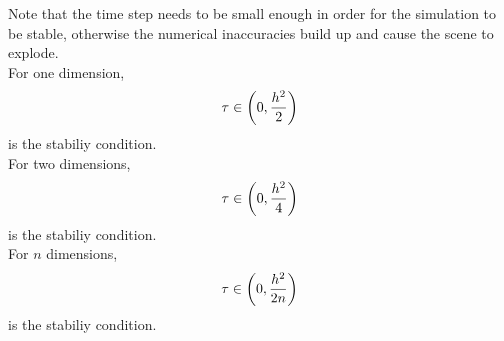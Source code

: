 \documentclass[12pt]{article}
\begin{document}
Note that the time step needs to be small enough
in order for the simulation to be stable, otherwise
the numerical inaccuracies build up and cause
the scene to explode. \\
For one dimension, \[ \tau \in \left( 0, 
\dfrac{h^2}{2} \right)\]
is the stabiliy condition. \\
For two dimensions, \[\tau \in \left( 0, 
\dfrac{h^2}{4} \right)\]
is the stabiliy condition. \\
For $n$ dimensions, \[\tau \in \left( 0, 
\dfrac{h^2}{2n} \right)\]
is the stabiliy condition. \\
\end{document}
